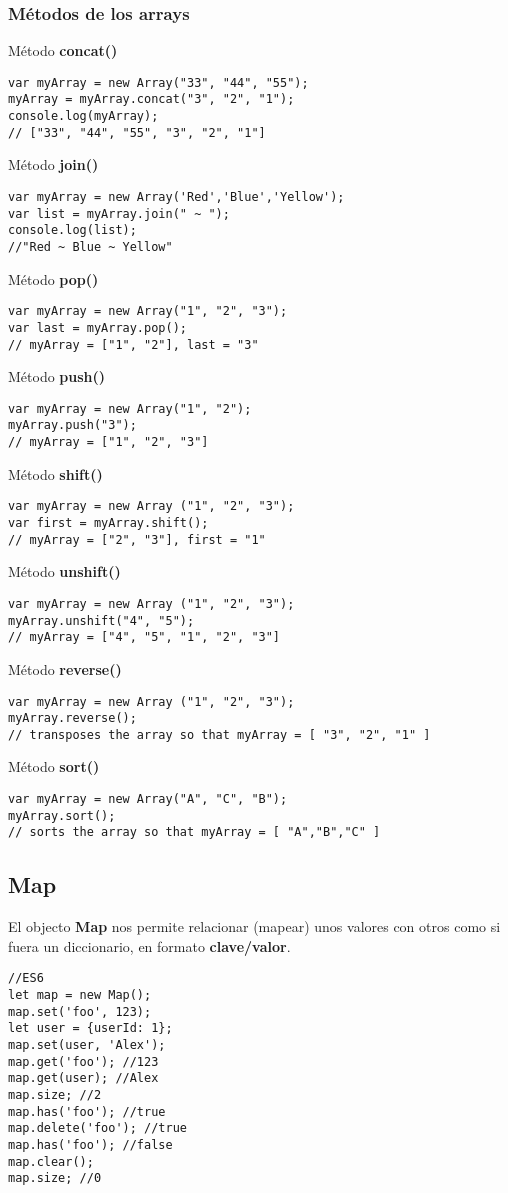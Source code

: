 \documentclass[4paper]{article}
\begin{document}
\subsubsection{Métodos de los arrays}
Método \textbf{concat()}
\begin{lstlisting}
var myArray = new Array("33", "44", "55");
myArray = myArray.concat("3", "2", "1");
console.log(myArray);
// ["33", "44", "55", "3", "2", "1"]
\end{lstlisting}
Método \textbf{join()}
\begin{lstlisting}
var myArray = new Array('Red','Blue','Yellow');
var list = myArray.join(" ~ ");
console.log(list);
//"Red ~ Blue ~ Yellow"
\end{lstlisting}
Método \textbf{pop()}
\begin{lstlisting}
var myArray = new Array("1", "2", "3");
var last = myArray.pop();
// myArray = ["1", "2"], last = "3"
\end{lstlisting}
Método \textbf{push()}
\begin{lstlisting}
var myArray = new Array("1", "2");
myArray.push("3");
// myArray = ["1", "2", "3"]
\end{lstlisting}
Método \textbf{shift()}
\begin{lstlisting}
var myArray = new Array ("1", "2", "3");
var first = myArray.shift();
// myArray = ["2", "3"], first = "1"
\end{lstlisting}
Método \textbf{unshift()}
\begin{lstlisting}
var myArray = new Array ("1", "2", "3");
myArray.unshift("4", "5");
// myArray = ["4", "5", "1", "2", "3"]
\end{lstlisting}
Método \textbf{reverse()}
\begin{lstlisting}
var myArray = new Array ("1", "2", "3");
myArray.reverse();
// transposes the array so that myArray = [ "3", "2", "1" ]
\end{lstlisting}
Método \textbf{sort()}
\begin{lstlisting}
var myArray = new Array("A", "C", "B");
myArray.sort();
// sorts the array so that myArray = [ "A","B","C" ]
\end{lstlisting}


\newpage
\subsection{Map}
El objecto \textbf{Map} nos permite relacionar (mapear) unos valores con otros como si fuera un diccionario, en formato \textbf{clave/valor}.
\begin{lstlisting}
//ES6
let map = new Map();
map.set('foo', 123);
let user = {userId: 1};
map.set(user, 'Alex');
map.get('foo'); //123
map.get(user); //Alex
map.size; //2
map.has('foo'); //true
map.delete('foo'); //true
map.has('foo'); //false
map.clear();
map.size; //0
\end{lstlisting}
\end{document}
